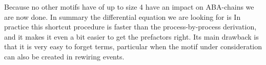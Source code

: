Because no other motifs have of up to size 4 have an impact on ABA-chains we are now done. In summary the differential equation we are looking for is 
In practice this shortcut procedure is faster than the process-by-process derivation, and it makes it even a bit easier to get the prefactors right. Its main drawback is that it is very easy to forget terms, particular when the motif under consideration can also be created in rewiring events. 